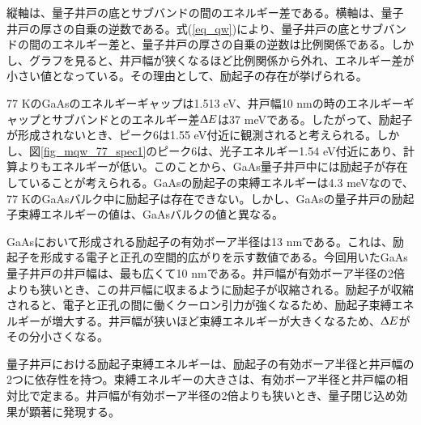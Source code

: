 \documentclass[11pt,a4j]{jsarticle}
\begin{document}
\begin{enumerate}
       縦軸は、量子井戸の底とサブバンドの間のエネルギー差である。横軸は、量子井戸の厚さの自乗の逆数である。式(\ref{eq_qw})により、量子井戸の底とサブバンドの間のエネルギー差と、量子井戸の厚さの自乗の逆数は比例関係である。しかし、グラフを見ると、井戸幅が狭くなるほど比例関係から外れ、エネルギー差が小さい値となっている。その理由として、励起子の存在が挙げられる。

       77 KのGaAsのエネルギーギャップは1.513 eV、井戸幅10 nmの時のエネルギーギャップとサブバンドとのエネルギー差$\Updelta E$は37 meVである。したがって、励起子が形成されないとき、ピーク6は1.55 eV付近に観測されると考えられる。しかし、図\ref{fig_mqw_77_spec1}のピーク6は、光子エネルギー1.54 eV付近にあり、計算よりもエネルギーが低い。このことから、GaAs量子井戸中には励起子が存在していることが考えられる。GaAsの励起子の束縛エネルギーは4.3 meVなので、77 KのGaAsバルク中に励起子は存在できない。しかし、GaAsの量子井戸の励起子束縛エネルギーの値は、GaAsバルクの値と異なる。

       GaAsにおいて形成される励起子の有効ボーア半径は13 nmである\cite{exciton}。これは、励起子を形成する電子と正孔の空間的広がりを示す数値である。今回用いたGaAs量子井戸の井戸幅は、最も広くて10 nmである。井戸幅が有効ボーア半径の2倍よりも狭いとき、この井戸幅に収まるように励起子が収縮される。励起子が収縮されると、電子と正孔の間に働くクーロン引力が強くなるため、励起子束縛エネルギーが増大する。井戸幅が狭いほど束縛エネルギーが大きくなるため、$\Updelta E$がその分小さくなる。

       量子井戸における励起子束縛エネルギーは、励起子の有効ボーア半径と井戸幅の2つに依存性を持つ。束縛エネルギーの大きさは、有効ボーア半径と井戸幅の相対比で定まる\cite{bohr}。井戸幅が有効ボーア半径の2倍よりも狭いとき、量子閉じ込め効果が顕著に発現する。




\end{enumerate}
\end{document}

